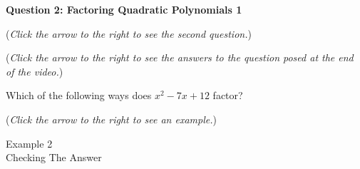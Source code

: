 \documentclass{ximera}
\begin{document}
\textbf{Question 2: Factoring Quadratic Polynomials 1}
\begin{question}
\begin{flushright}
{\color{blue}(\emph{Click the arrow to the right to see the second question.})}
\end{flushright}
\begin{center}
\begin{expandable}
{\color{blue}(\emph{Click the arrow to the right to see the answers 
to the question posed at the end of the video.})}
\begin{expandable}
Which of the following ways does $x^2-7x+12$ factor?
\begin{multipleChoice}
\end{multipleChoice}
\begin{flushright}
{\color{blue}(\emph{Click the arrow to the right to see an example.})}
\end{flushright}
\begin{expandable}
Example 2
\\

Checking The Answer
\end{expandable}
\end{expandable}
\end{expandable}
\end{center}
\end{question}
\end{document}
